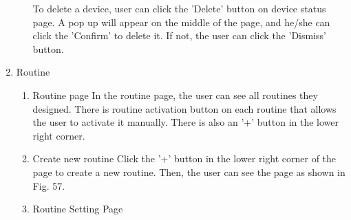 \begin{enumerate}[label=\arabic*.]
\begin{enumerate}[label*={\arabic*.},ref=\theenumi.\arabic*]
                    To delete a device, user can click the 'Delete' button on device status page. A pop up will appear on the middle of the page, and he/she can click the 'Confirm' to delete it. If not, the user can click the 'Dismiss' button.\\
          \end{enumerate}
          \newpage
    \item {\large{Routine}}\\
          \begin{enumerate}[label*={\arabic*.},ref=\theenumi.\arabic*]
              \item Routine page
                    In the routine page, the user can see all routines they designed. There is routine activation button on each routine that allows the user to activate it manually. There is also an '+' button in the lower right corner.\\
                    \newpage
              \item Create new routine
                    Click the '+' button in the lower right corner of the page to create a new routine. Then, the user can see the page as shown in Fig. 57.\\
                    \newpage
              \item Routine Setting Page
\end{enumerate}
\end{enumerate}
